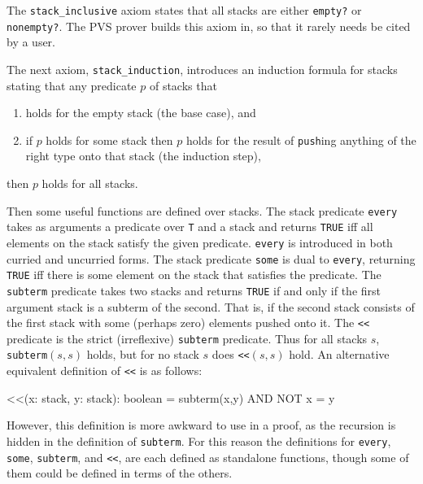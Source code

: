 The \texttt{stack\_inclusive} axiom states that all stacks are either
\texttt{empty?} or \texttt{nonempty?}.  The PVS prover builds this axiom
in, so that it rarely needs be cited by a user.

\newpage
The next axiom, \texttt{stack\_induction}, introduces an induction formula
for stacks stating that any predicate $p$ of stacks that
\begin{enumerate}
\item holds for the empty stack (the base case), and
\item if $p$ holds for some stack then $p$ holds for the result of
\texttt{push}ing anything of the right type onto that stack (the induction
step),
\end{enumerate}
then $p$ holds for all stacks.

Then some useful functions are defined over stacks.  The stack predicate
\texttt{every} takes as arguments a predicate over \texttt{T} and a stack
and returns \texttt{TRUE} iff all elements on the stack satisfy the given
predicate.  \texttt{every} is introduced in both curried and uncurried
forms.  The stack predicate \texttt{some} is dual to \texttt{every},
returning \texttt{TRUE} iff there is some element on the stack that
satisfies the predicate.  The \texttt{subterm} predicate takes two stacks
and returns \texttt{TRUE} if and only if the first argument stack is a
subterm of the second.  That is, if the second stack consists of the first
stack with some (perhaps zero) elements pushed onto it.  The \texttt{<<}
predicate is the strict (irreflexive) \texttt{subterm} predicate.  Thus
for all stacks $s$, \texttt{subterm}$(s,s)$ holds, but for no stack $s$
does \texttt{<<}$(s,s)$ hold.  An alternative equivalent definition of
\texttt{<<} is as follows:
\begin{pvsex}
  <<(x: stack, y: stack): boolean = subterm(x,y) AND NOT x = y
\end{pvsex}
However, this definition is more awkward to use in a proof, as the
recursion is hidden in the definition of \texttt{subterm}.  For this
reason the definitions for \texttt{every}, \texttt{some},
\texttt{subterm}, and \texttt{<<}, are each defined as standalone
functions, though some of them could be defined in terms of the others.

